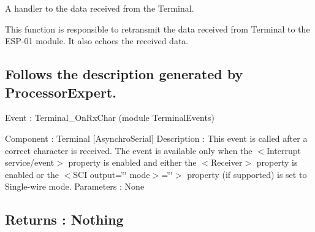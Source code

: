 A handler to the data received from the Terminal. 

This function is responsible to retransmit the data received from Terminal to the E\+S\+P-\/01 module. It also echoes the received data.

\subsection*{Follows the description generated by Processor\+Expert. }

Event \+: Terminal\+\_\+\+On\+Rx\+Char (module Terminal\+Events)

Component \+: Terminal \mbox{[}Asynchro\+Serial\mbox{]} Description \+: This event is called after a correct character is received. The event is available only when the $<$Interrupt service/event$>$ property is enabled and either the $<$\+Receiver$>$ property is enabled or the $<$\+S\+C\+I output=\char`\"{}\char`\"{} mode$>$=\char`\"{}\char`\"{}$>$ property (if supported) is set to Single-\/wire mode. Parameters \+: None \subsection*{Returns \+: Nothing }